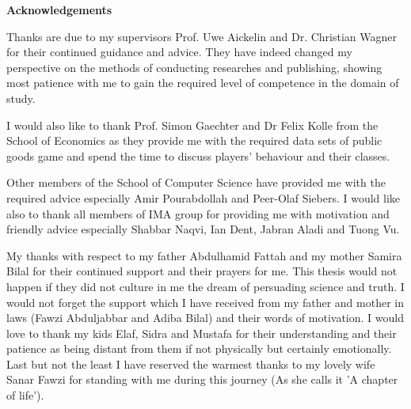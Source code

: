 \begin{center}
	
	\textbf{Acknowledgements}
\end{center}

\normalsize


Thanks are due to my supervisors Prof. Uwe Aickelin and Dr. Christian Wagner for their continued guidance and advice. They have indeed changed my perspective on the methods of conducting researches and publishing, showing most patience with me to gain the required level of competence in the domain of study.

I would also like to thank Prof. Simon Gaechter and Dr Felix Kolle from the School of Economics as they provide me with the required data sets of public goods game and spend the time to discuss players' behaviour and their classes.

Other members of the School of Computer Science have provided me with the required advice especially Amir Pourabdollah and Peer-Olaf Siebers. I would like also to thank all members of IMA group for providing me with motivation and friendly advice especially Shabbar Naqvi, Ian Dent, Jabran Aladi and Tuong Vu.

My thanks with respect to my father Abdulhamid Fattah and my mother Samira Bilal for their continued support and their prayers for me. This thesis would not happen if they did not culture in me the dream of persuading science and truth.  I would not forget the support which I have received from my father and mother in laws (Fawzi Abduljabbar and Adiba Bilal) and their words of motivation. I would love to thank my kids Elaf, Sidra and Mustafa for their understanding and their patience as being distant from them if not physically but certainly emotionally. Last but not the least I have reserved the warmest thanks to my lovely wife Sanar Fawzi for standing with me during this journey (As she calls it 'A chapter of life').